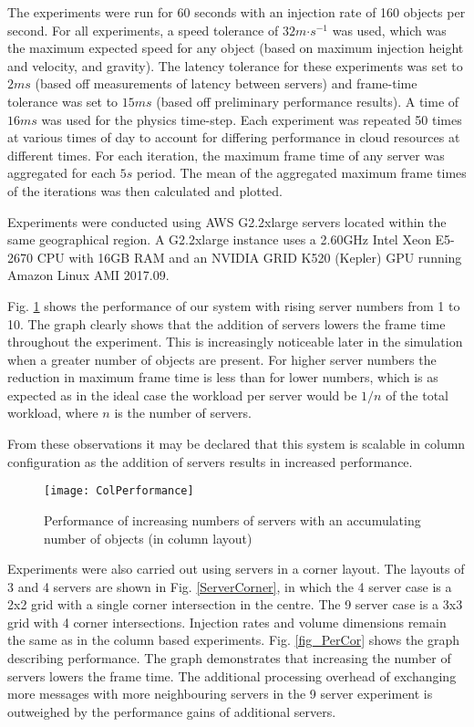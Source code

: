 The experiments were run for 60 seconds with an injection rate of 160 objects per second. For all experiments, a speed tolerance of $32m\mathord{\cdot}s^{-1}$ was used, which was the maximum expected speed for any object (based on maximum injection height and velocity, and gravity). The latency tolerance for these experiments was set to $2ms$ (based off measurements of latency between servers) and frame-time tolerance was set to $15ms$ (based off preliminary performance results). A time of $16ms$ was used for the physics time-step. Each experiment was repeated 50 times at various times of day to account for differing performance in cloud resources at different times. For each iteration, the maximum frame time of any server was aggregated for each $5s$ period. The mean of the aggregated maximum frame times of the iterations was then calculated and plotted.

Experiments were conducted using AWS G2.2xlarge servers located within the same geographical region. A G2.2xlarge instance uses a 2.60GHz Intel Xeon E5-2670 CPU with 16GB RAM and an NVIDIA GRID K520 (Kepler) GPU running Amazon Linux AMI 2017.09.

Fig. \ref{fig_PerCol} shows the performance of our system with rising server numbers from 1 to 10. The graph clearly shows that the addition of servers lowers the frame time throughout the experiment. This is increasingly noticeable later in the simulation when a greater number of objects are present. For higher server numbers the reduction in maximum frame time is less than for lower numbers, which is as expected as in the ideal case the workload per server would be $1/n$ of the total workload, where $n$ is the number of servers. 

From these observations it may be declared that this system is scalable in column configuration as the addition of servers results in increased performance.

\begin{figure}[!t]
	\centering
	\texttt{[image: ColPerformance]}
	\caption{Performance of increasing numbers of servers with an accumulating number of objects (in column layout)}
	\label{fig_PerCol}
\end{figure}

Experiments were also carried out using servers in a corner layout. The layouts of 3 and 4 servers are shown in Fig. \ref{ServerCorner}, in which the 4 server case is a 2x2 grid with a single corner intersection in the centre. The 9 server case is a 3x3 grid with 4 corner intersections. Injection rates and volume dimensions remain the same as in the column based experiments. Fig. \ref{fig_PerCor} shows the graph describing performance. The graph demonstrates that increasing the number of servers lowers the frame time. The additional processing overhead of exchanging more messages with more neighbouring servers in the 9 server experiment is outweighed by the performance gains of additional servers.

